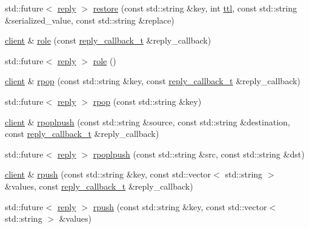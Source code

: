 \begin{DoxyCompactItemize}
\item 
std\+::future$<$ \hyperlink{classcpp__redis_1_1reply}{reply} $>$ \hyperlink{classcpp__redis_1_1client_a15b2c81c1d5b86f3490ecfb154b29ad1}{restore} (const std\+::string \&key, int \hyperlink{classcpp__redis_1_1client_a667bb7a6ead9c8cdaba534033a467367}{ttl}, const std\+::string \&serialized\+\_\+value, const std\+::string \&replace)
\item 
\hyperlink{classcpp__redis_1_1client}{client} \& \hyperlink{classcpp__redis_1_1client_a73bc7e0a747d437e5f9ac233a152c9bc}{role} (const \hyperlink{classcpp__redis_1_1client_a061a1140d36d2eaeda82b09a0bb3f9f2}{reply\+\_\+callback\+\_\+t} \&reply\+\_\+callback)
\item 
std\+::future$<$ \hyperlink{classcpp__redis_1_1reply}{reply} $>$ \hyperlink{classcpp__redis_1_1client_a34abe0819734b88704d89972b651e7ed}{role} ()
\item 
\hyperlink{classcpp__redis_1_1client}{client} \& \hyperlink{classcpp__redis_1_1client_aa29c7c00278934074e3cdbf70c0bb9cc}{rpop} (const std\+::string \&key, const \hyperlink{classcpp__redis_1_1client_a061a1140d36d2eaeda82b09a0bb3f9f2}{reply\+\_\+callback\+\_\+t} \&reply\+\_\+callback)
\item 
std\+::future$<$ \hyperlink{classcpp__redis_1_1reply}{reply} $>$ \hyperlink{classcpp__redis_1_1client_a7a2ea6e56ce9fa430cfc44ada77d960b}{rpop} (const std\+::string \&key)
\item 
\hyperlink{classcpp__redis_1_1client}{client} \& \hyperlink{classcpp__redis_1_1client_a1d50b5d26753768d79ebbe04f3615c7a}{rpoplpush} (const std\+::string \&source, const std\+::string \&destination, const \hyperlink{classcpp__redis_1_1client_a061a1140d36d2eaeda82b09a0bb3f9f2}{reply\+\_\+callback\+\_\+t} \&reply\+\_\+callback)
\item 
std\+::future$<$ \hyperlink{classcpp__redis_1_1reply}{reply} $>$ \hyperlink{classcpp__redis_1_1client_a4c4fd3342f665a4d902b42b051797e51}{rpoplpush} (const std\+::string \&src, const std\+::string \&dst)
\item 
\hyperlink{classcpp__redis_1_1client}{client} \& \hyperlink{classcpp__redis_1_1client_a925a0b8ae7864783d9e164776ca07075}{rpush} (const std\+::string \&key, const std\+::vector$<$ std\+::string $>$ \&values, const \hyperlink{classcpp__redis_1_1client_a061a1140d36d2eaeda82b09a0bb3f9f2}{reply\+\_\+callback\+\_\+t} \&reply\+\_\+callback)
\item 
std\+::future$<$ \hyperlink{classcpp__redis_1_1reply}{reply} $>$ \hyperlink{classcpp__redis_1_1client_a1e135e9e69a92a0b54059d5f81f9ff25}{rpush} (const std\+::string \&key, const std\+::vector$<$ std\+::string $>$ \&values)

\end{DoxyCompactItemize}
